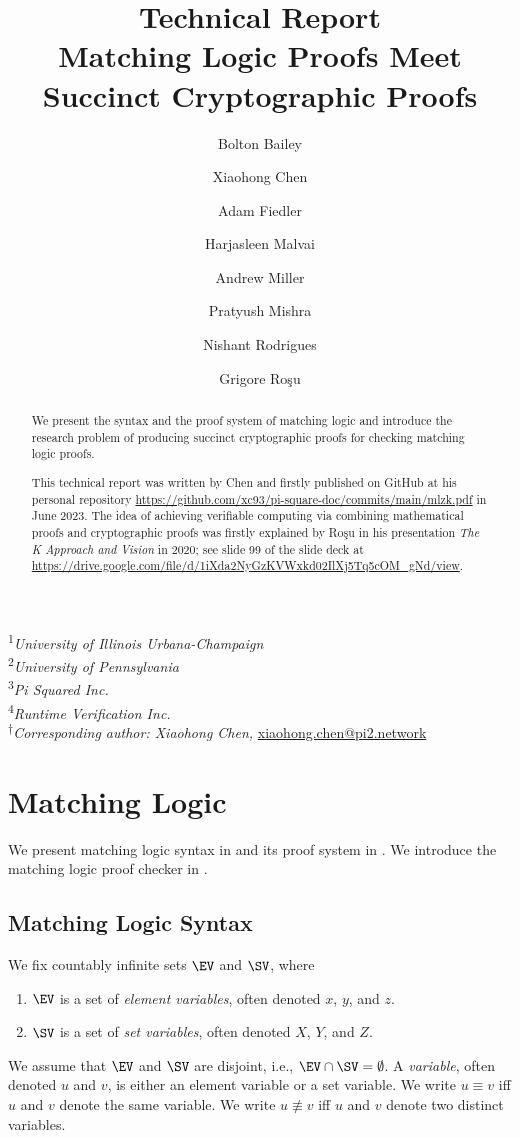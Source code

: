\documentclass{article}
\title{{\Large Technical Report}\\
  Matching Logic Proofs Meet Succinct Cryptographic Proofs}
\author{Bolton Bailey\af{\afuiuc,\afpisqrd}
   \and Xiaohong Chen\af{\afuiuc,\afpisqrd,\afrv,$\dag$} 
    \and Adam Fiedler\af{\afpisqrd,\afrv} 
    \and Harjasleen Malvai\af{\afuiuc} 
    \and Andrew Miller\af{\afuiuc} 
    \and Pratyush Mishra\af{\afupen} 
    \and Nishant Rodrigues\af{\afuiuc,\afpisqrd,\afrv} 
    \and Grigore Ro{\c{s}}u\af{\afuiuc,\afpisqrd,\afrv}
}
\date{}
\newcommand{\afuiuc}{1}
\newcommand{\afupen}{2}
\newcommand{\afpisqrd}{3}
\newcommand{\afrv}{4}
\begin{document}
\maketitle

\vspace{-2\baselineskip}
\begin{center}
\textsuperscript{\afuiuc}\textit{University of Illinois Urbana-Champaign}\\
\textsuperscript{\afupen}\textit{University of Pennsylvania}\\
\textsuperscript{\afpisqrd}\textit{Pi Squared Inc.}\\
\textsuperscript{\afrv}\textit{Runtime Verification Inc.}\\
\textsuperscript{$\dag$}\textit{Corresponding author: Xiaohong Chen, }\url{xiaohong.chen@pi2.network}
\end{center}

\begin{abstract}
We present the syntax and the proof system of matching logic
and introduce the research problem of producing 
succinct cryptographic proofs for checking matching logic proofs. 

This technical report was written by Chen and firstly published
on GitHub at his personal repository
\url{https://github.com/xc93/pi-square-doc/commits/main/mlzk.pdf}
in June 2023. 
The idea of achieving verifiable computing 
via combining mathematical proofs and cryptographic proofs
was firstly explained by Ro\c{s}u in his presentation
\textit{The K Approach and Vision} in 2020;
see slide 99 of the slide deck at
\url{https://drive.google.com/file/d/1iXda2NyGzKVWxkd02IlXj5Tq5cOM_gNd/view}. 
\end{abstract}

\section{Matching Logic}

We present matching logic syntax in 
and its proof system in .
We introduce the matching logic proof checker in .

\subsection{Matching Logic Syntax}
\label{sec:ml_syntax}

We fix countably infinite sets $\EV$ and $\SV$, where
\begin{enumerate}
\item $\EV$ is a set of \emph{element variables},
      often denoted $x$, $y$, and $z$.
\item $\SV$ is a set of \emph{set variables},
      often denoted $X$, $Y$, and $Z$.
\end{enumerate}
We assume that $\EV$ and $\SV$ are disjoint, i.e., $\EV \cap \SV = \emptyset$.
A \emph{variable}, often denoted $u$ and $v$,
is either an element variable or a set variable.
We write $u \equiv v$ iff $u$ and $v$ denote the same variable.
We write $u \not\equiv v$ iff $u$ and $v$ denote two distinct variables.
\end{document}
